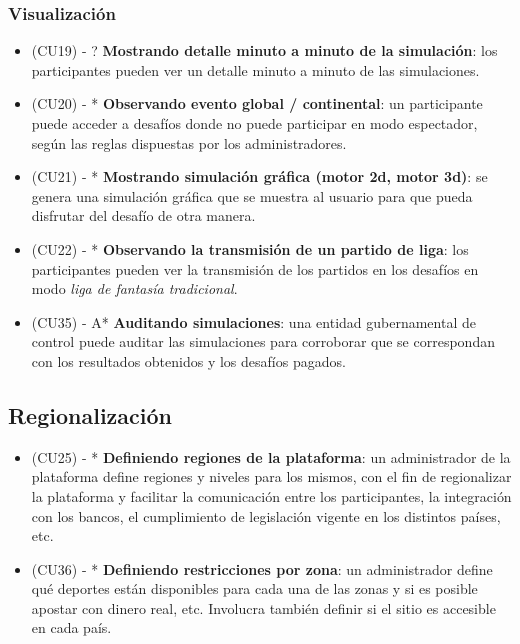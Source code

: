 \subsubsection{Visualización}
\begin{itemize}
\item (CU19) - ? \textbf{Mostrando detalle minuto a minuto de la simulación}: los participantes pueden ver un detalle minuto a minuto de las simulaciones.
\item (CU20) - * \textbf{Observando evento global / continental}: un participante puede acceder a desafíos donde no puede participar en modo espectador, según las reglas dispuestas por los administradores.
\item (CU21) - * \textbf{Mostrando simulación gráfica (motor 2d, motor 3d)}: se genera una simulación gráfica que se muestra al usuario para que pueda disfrutar del desafío de otra manera.
\item (CU22) - * \textbf{Observando la transmisión de un partido de liga}: los participantes pueden ver la transmisión de los partidos en los desafíos en modo \emph{liga de fantasía tradicional}.
\item (CU35) - A* \textbf{Auditando simulaciones}: una entidad gubernamental de control puede auditar las simulaciones para corroborar que se correspondan con los resultados obtenidos y los desafíos pagados.
\end{itemize}


\subsection{Regionalización}
\begin{itemize}
\item (CU25) - * \textbf{Definiendo regiones de la plataforma}: un administrador de la plataforma define regiones y niveles para los mismos, con el fin de regionalizar la plataforma y facilitar la comunicación entre los participantes, la integración con los bancos, el cumplimiento de legislación vigente en los distintos países, etc.
\item (CU36) - * \textbf{Definiendo restricciones por zona}: un administrador define qué deportes están disponibles para cada una de las zonas y si es posible apostar con dinero real, etc. Involucra también definir si el sitio es accesible en cada país.
\end{itemize}






